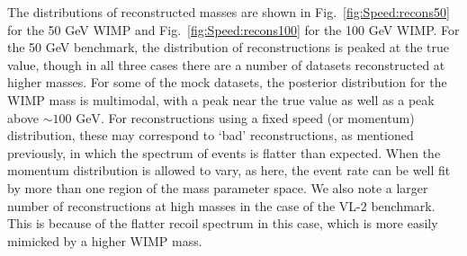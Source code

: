 The distributions of reconstructed masses are shown in Fig.\ \ref{fig:Speed:recons50} for the 50 GeV WIMP and Fig.\ \ref{fig:Speed:recons100} for the 100 GeV WIMP. For the 50 GeV benchmark, the distribution of reconstructions is peaked at the true value, though in all three cases there are a number of datasets reconstructed at higher masses. For some of the mock datasets, the posterior distribution for the WIMP mass is multimodal, with a peak near the true value as well as a peak above \(\sim 100 \textrm{ GeV}\). For reconstructions using a fixed speed (or momentum) distribution, these may correspond to `bad' reconstructions, as mentioned previously, in which the spectrum of events is flatter than expected. When the momentum distribution is allowed to vary, as here, the event rate can be well fit by more than one region of the mass parameter space.  We also note a larger number of reconstructions at high masses in the case of the VL-2 benchmark. This is because of the flatter recoil spectrum in this case, which is more easily mimicked by a higher WIMP mass.

